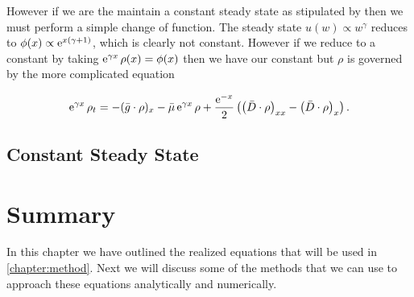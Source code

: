\documentclass[../main]{subfiles}
\begin{document}
  However if we are the maintain a constant steady state as stipulated by \cite{sheldon1967} then we must perform a simple change of function. The steady state $u(w) \propto w^{\gamma}$ reduces to $\phi(x) \propto \operatorname{e}^{x(\gamma +1)}$, which is clearly not constant. However if we reduce to a constant by taking $\operatorname{e}^{\gamma x} \rho(x) = \phi(x)$ then we have our constant but $\rho$ is governed by the more complicated equation

  \begin{equation}
    \operatorname{e}^{\gamma x} \rho_t = - (\bar{g} \cdot \rho)_x - \bar{\mu} \operatorname{e}^{\gamma x} \rho + \frac{\operatorname{e}^{-x}}{2} \left( \left( \bar{D} \cdot \rho \right)_{xx} - \left( \bar{D} \cdot \rho \right)_x \right).
  \end{equation}

  \subsection{Constant Steady State}

  \section{Summary}
  In this chapter we have outlined the realized equations that will be used in \autoref{chapter:method}. Next we will discuss some of the methods that we can use to approach these equations analytically and numerically.
\end{document}
